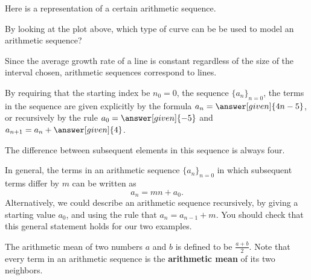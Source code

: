 \documentclass{ximera}
\begin{document}
\begin{example}
  Here is a representation of a certain arithmetic sequence.
  \begin{image}
  \end{image}
  
 \begin{question}
 By looking at the plot above, which type of curve can be be used to model an arithmetic sequence?

  \begin{feedback}
    Since the average growth rate of a line is constant regardless of
    the size of the interval chosen, arithmetic sequences correspond to
    lines.
  \end{feedback}
\end{question}


  By requiring that the starting index be $n_0=0$, the sequence $\{a_n\}_{n=0}$, the terms in the sequence are given explicitly by the formula $a_n=\answer[given]{4n-5}$,
  or recursively by the rule $a_0 = \answer[given]{-5}$ and $a_{n+1} = a_n
  + \answer[given]{4}$. 

  The difference between subsequent elements in this sequence is always four.
\end{example}

In general, the terms in an arithmetic sequence $\{a_n\}_{n=0}$ in which subsequent terms differ
by $m$ can be written as
\[
a_n = m n + a_0.
\]
Alternatively, we could describe an arithmetic sequence recursively,
by giving a starting value $a_0$, and using the rule that $a_{n} =
a_{n-1} + m$.  You should check that this general statement holds for our 
two examples.


\begin{remark}
The arithmetic mean of two numbers $a$ and $b$ is defined to be $\frac{a+b}{2}$. Note that every term in an arithmetic sequence is the \textbf{arithmetic mean} of its two neighbors.  
\end{remark}
\end{document}
